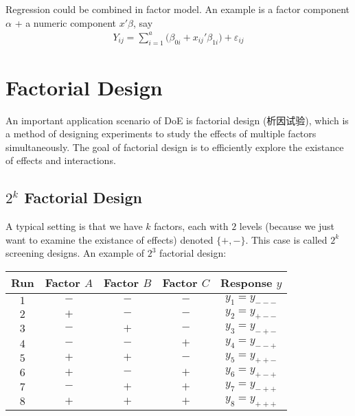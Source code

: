 Regression could be combined in factor model. An example is a factor component $ \alpha  $ + a numeric component $ x'\beta  $, say
\begin{align*}
    Y_{ij}= \sum_{i=1}^a\big( \beta _{0i}+x_{ij}'\beta _{1i} \big)+\varepsilon _{ij} 
\end{align*}




\section{Factorial Design}
An important application scenario of DoE is factorial design (析因试验), which is a method of designing experiments to study the effects of multiple factors simultaneously. The goal of factorial design is to efficiently explore the existance of effects and interactions.


\subsection{$ 2^k $ Factorial Design}

A typical setting is that we have $ k $ factors, each with $ 2 $ levels (because we just want to examine the existance of effects) denoted $ \{+,-\} $. This case is called $ 2^k $ screening designs. An example of $ 2^3 $ factorial design:

\begin{table}[H]
    \centering
    \renewcommand\arraystretch{1.15}
    \begin{tabular}{ccccc}
        \hline
            Run & Factor $ A $ & Factor $ B $ & Factor $ C $ & Response $ y $\\
        \hline
            $ 1 $&$ - $&$ - $&$ - $&$ y_1=y_{---} $\\
            $ 2 $&$ + $&$ - $&$ - $&$ y_2=y_{+--} $\\
            $ 3 $&$ - $&$ + $&$ - $&$ y_3=y_{-+-} $\\
            $ 4 $&$ - $&$ - $&$ + $&$ y_4=y_{--+} $\\
            $ 5 $&$ + $&$ + $&$ - $&$ y_5=y_{++-} $\\
            $ 6 $&$ + $&$ - $&$ + $&$ y_6=y_{+-+} $\\
            $ 7 $&$ - $&$ + $&$ + $&$ y_7=y_{-++} $\\
            $ 8 $&$ + $&$ + $&$ + $&$ y_8=y_{+++} $\\
        \hline
    \end{tabular}
\end{table}

